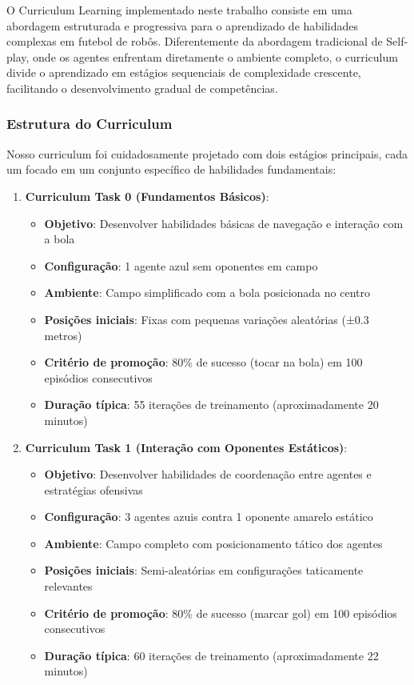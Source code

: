 O Curriculum Learning implementado neste trabalho consiste em uma abordagem estruturada e progressiva para o aprendizado de habilidades complexas em futebol de robôs. Diferentemente da abordagem tradicional de Self-play, onde os agentes enfrentam diretamente o ambiente completo, o curriculum divide o aprendizado em estágios sequenciais de complexidade crescente, facilitando o desenvolvimento gradual de competências.

\subsubsection{Estrutura do Curriculum}

Nosso curriculum foi cuidadosamente projetado com dois estágios principais, cada um focado em um conjunto específico de habilidades fundamentais:

\begin{enumerate}
    \item \textbf{Curriculum Task 0 (Fundamentos Básicos)}: 
    \begin{itemize}
        \item \textbf{Objetivo}: Desenvolver habilidades básicas de navegação e interação com a bola
        \item \textbf{Configuração}: 1 agente azul sem oponentes em campo
        \item \textbf{Ambiente}: Campo simplificado com a bola posicionada no centro
        \item \textbf{Posições iniciais}: Fixas com pequenas variações aleatórias (±0.3 metros)
        \item \textbf{Critério de promoção}: 80\% de sucesso (tocar na bola) em 100 episódios consecutivos
        \item \textbf{Duração típica}: 55 iterações de treinamento (aproximadamente 20 minutos)
    \end{itemize}
    
    \item \textbf{Curriculum Task 1 (Interação com Oponentes Estáticos)}:
    \begin{itemize}
        \item \textbf{Objetivo}: Desenvolver habilidades de coordenação entre agentes e estratégias ofensivas
        \item \textbf{Configuração}: 3 agentes azuis contra 1 oponente amarelo estático
        \item \textbf{Ambiente}: Campo completo com posicionamento tático dos agentes
        \item \textbf{Posições iniciais}: Semi-aleatórias em configurações taticamente relevantes
        \item \textbf{Critério de promoção}: 80\% de sucesso (marcar gol) em 100 episódios consecutivos
        \item \textbf{Duração típica}: 60 iterações de treinamento (aproximadamente 22 minutos)
    \end{itemize}
\end{enumerate}

